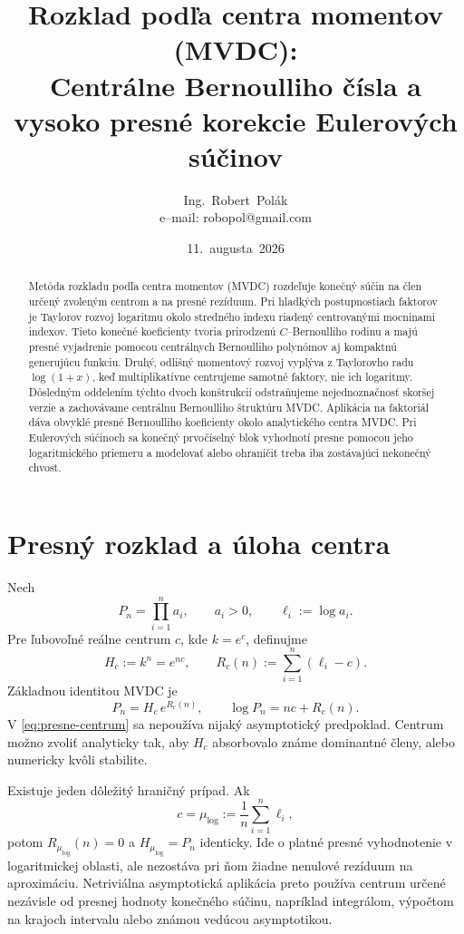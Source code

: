 \documentclass[11pt,a4paper]{article}
\title{Rozklad podľa centra momentov (MVDC):\\
Centrálne Bernoulliho čísla a vysoko presné korekcie Eulerových súčinov}
\author{Ing.~Robert~Polák\\\small e--mail: robopol@gmail.com}
\date{11.~augusta~2026}
\begin{document}
\maketitle

\begin{abstract}
Metóda rozkladu podľa centra momentov (MVDC) rozdeľuje konečný súčin na
člen určený zvoleným centrom a na presné rezíduum. Pri hladkých
postupnostiach faktorov je Taylorov rozvoj logaritmu okolo stredného
indexu riadený centrovanými mocninami indexov. Tieto konečné koeficienty
tvoria prirodzenú \(C\)--Bernoulliho rodinu a majú presné vyjadrenie
pomocou centrálnych Bernoulliho polynómov aj kompaktnú generujúcu
funkciu. Druhý, odlišný momentový rozvoj vyplýva z Taylorovho radu
\(\log(1+x)\), keď multiplikatívne centrujeme samotné faktory, nie ich
logaritmy. Dôsledným oddelením týchto dvoch konštrukcií odstraňujeme
nejednoznačnosť skoršej verzie a zachovávame centrálnu Bernoulliho
štruktúru MVDC. Aplikácia na faktoriál dáva obvyklé presné Bernoulliho
koeficienty okolo analytického centra MVDC. Pri Eulerových súčinoch sa
konečný prvočíselný blok vyhodnotí presne pomocou jeho logaritmického
priemeru a modelovať alebo ohraničiť treba iba zostávajúci nekonečný
chvost.
\end{abstract}

\section{Presný rozklad a úloha centra}

Nech
\[
  P_n=\prod_{i=1}^{n}a_i,\qquad a_i>0,\qquad
  \ell_i:=\log a_i .
\]
Pre ľubovoľné reálne centrum \(c\), kde \(k=e^c\), definujme
\[
  H_c:=k^n=e^{nc},\qquad
  R_c(n):=\sum_{i=1}^{n}(\ell_i-c).
\]
Základnou identitou MVDC je
\begin{equation}\label{eq:presne-centrum}
  \boxed{\;P_n=H_c\,e^{R_c(n)},\qquad
  \log P_n=nc+R_c(n).\;}
\end{equation}
V \eqref{eq:presne-centrum} sa nepoužíva nijaký asymptotický predpoklad.
Centrum možno zvoliť analyticky tak, aby \(H_c\) absorbovalo známe
dominantné členy, alebo numericky kvôli stabilite.

Existuje jeden dôležitý hraničný prípad. Ak
\[
  c=\mu_{\log}:=\frac1n\sum_{i=1}^{n}\ell_i,
\]
potom \(R_{\mu_{\log}}(n)=0\) a \(H_{\mu_{\log}}=P_n\) identicky.
Ide o platné presné vyhodnotenie v logaritmickej oblasti, ale nezostáva
pri ňom žiadne nenulové rezíduum na aproximáciu. Netriviálna asymptotická
aplikácia preto používa centrum určené nezávisle od presnej hodnoty
konečného súčinu, napríklad integrálom, výpočtom na krajoch intervalu
alebo známou vedúcou asymptotikou.
\end{document}
